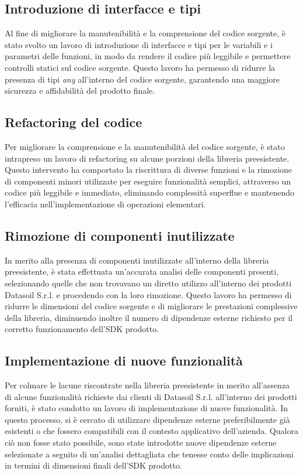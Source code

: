 \subsection{Introduzione di interfacce e tipi}
Al fine di migliorare la manutenibilità e la comprensione del codice sorgente, è stato svolto un lavoro di introduzione di interfacce e tipi per le variabili e i parametri
delle funzioni, in modo da rendere il codice più leggibile e permettere controlli statici sul codice sorgente. \newline
Questo lavoro ha permesso di ridurre la presenza di tipi \textit{any} all'interno del codice sorgente, garantendo una maggiore sicurezza e affidabilità del prodotto finale.

\subsection{Refactoring del codice}
Per migliorare la comprensione e la manutenibilità del codice sorgente, è stato intrapreso un lavoro di refactoring su alcune porzioni della libreria preesistente.
Questo intervento ha comportato la riscrittura di diverse funzioni e la rimozione di componenti minori utilizzate per eseguire funzionalità semplici, attraverso un codice
più leggibile e immediato, eliminando complessità superflue e mantenendo l'efficacia nell'implementazione di operazioni elementari.

\subsection{Rimozione di componenti inutilizzate}
In merito alla presenza di componenti inutilizzate all'interno della libreria preesistente, è stata effettuata un'accurata analisi delle componenti presenti, selezionando
quelle che non trovavano un diretto utilizzo all'interno dei prodotti Datasoil S.r.l. e procedendo con la loro rimozione. \newline
Questo lavoro ha permesso di ridurre le dimensioni del codice sorgente e di migliorare le prestazioni complessive della libreria, diminuendo inoltre il numero di dipendenze
esterne richiesto per il corretto funzionamento dell'SDK prodotto.

\subsection{Implementazione di nuove funzionalità}
Per colmare le lacune riscontrate nella libreria preesistente in merito all'assenza di alcune funzionalità richieste dai clienti di Datasoil S.r.l. all'interno dei prodotti forniti,
è stato condotto un lavoro di implementazione di nuove funzionalità. \newline
In questo processo, si è cercato di utilizzare dipendenze esterne preferibilmente già esistenti o che fossero compatibili con il contesto applicativo dell'azienda. Qualora ciò non
fosse stato possibile, sono state introdotte nuove dipendenze esterne selezionate a seguito di un'analisi dettagliata che tenesse conto delle implicazioni in termini di dimensioni
finali dell'SDK prodotto.

